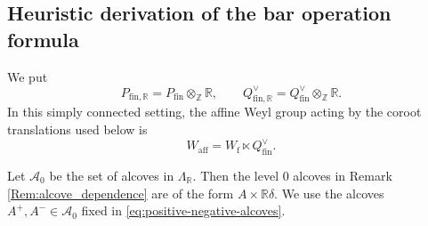 \documentclass{amsart}
\theoremstyle{definition}
\numberwithin{equation}{section}
\begin{document}
\subsection{Heuristic derivation of the bar operation formula}\label{sec:heuristic}
%
We put
\[
P_{\mathrm{fin},\mathbb R}=P_{\mathrm{fin}}\otimes_{\mathbb Z}\mathbb R,
\qquad
Q_{\mathrm{fin},\mathbb R}^\vee
=Q_{\mathrm{fin}}^\vee\otimes_{\mathbb Z}\mathbb R.
\]
In this simply connected setting, the affine Weyl group acting by the
coroot translations used below is
\[
W_{\mathrm{aff}}=W_{\mathrm f}\ltimes Q_{\mathrm{fin}}^\vee.
\]

Let $\mathcal{A}_0$ be the set of alcoves in $\Lambda_{\mathbb R}$. Then the level 0 alcoves in Remark \ref{Rem:alcove_dependence} are of the form $A\times \mathbb{R}\delta$.
We use the alcoves \(A^+,A^-\in\mathcal A_0\) fixed in
\eqref{eq:positive-negative-alcoves}. %
\end{document}
